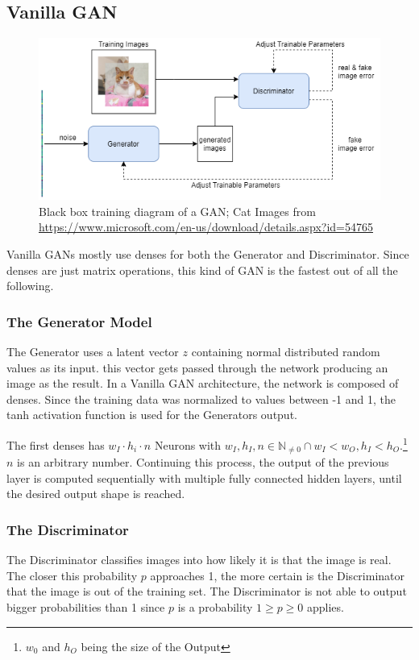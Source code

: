 \documentclass{article}
\begin{document}
\subsection{Vanilla GAN}
\label{ref:vanilla_gan}
\begin{figure}[!ht]
    \centering
    \includegraphics[scale=0.6]{images/DCGANBlackbox.png}
    \caption{Black box training diagram of a GAN; Cat Images from \url{https://www.microsoft.com/en-us/download/details.aspx?id=54765}}
    \label{fig:DCGANBlackbox}
\end{figure}
Vanilla GANs mostly use \glspl{dense} for both the Generator and Discriminator. Since \glspl{dense} are just matrix operations, this kind of GAN is the fastest out of all the following. 

\subsubsection{The Generator Model}
The Generator uses a latent vector $z$ containing normal distributed random values as its input. this vector gets passed through the network producing an image as the result. In a Vanilla GAN architecture, the network is composed of \glspl{dense}. 
Since the training data was normalized to values between -1 and 1, the tanh activation function is used for the Generators output.

The first \glspl{dense} has $w_I\cdot h_i \cdot n$ Neurons with $w_I, h_I, n \in \mathbb N _{\ne 0} \cap w_I < w_O, h_I < h_O$.\footnote{$w_0$ and $h_O$ being the size of the Output} $n$ is an arbitrary number. Continuing this process, the output of the previous layer is computed sequentially with multiple fully connected hidden layers, until the desired output shape is reached. 

\subsubsection{The Discriminator}
The Discriminator classifies images into how likely it is that the image is real. The closer this probability $p$ approaches 1, the more certain is the Discriminator that the image is out of the training set. The Discriminator is not able to output bigger probabilities than 1 since $p$ is a probability $1 \geq p \geq 0$ applies.
\end{document}
